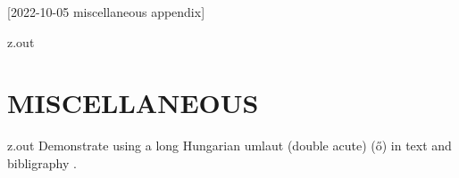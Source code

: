 [2022-10-05 miscellaneous appendix]

\begin{VerbatimOut}{z.out}
\chapter{MISCELLANEOUS}
\end{VerbatimOut}

\MyIO


\begin{VerbatimOut}{z.out}
Demonstrate using a long Hungarian umlaut
(double acute)
(\H{o})
in text and bibligraphy
\cite{erdos1992}.
\end{VerbatimOut}

\MyIO
